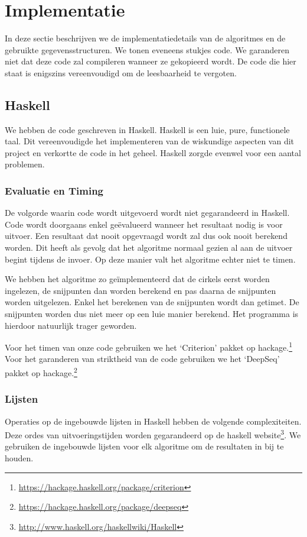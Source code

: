 \newpage
\section{Implementatie}
\label{sec:implementation}
In deze sectie beschrijven we de implementatiedetails van de algoritmes en de gebruikte gegevensstructuren. We tonen eveneens stukjes code. We garanderen niet dat deze code zal compileren wanneer ze gekopieerd wordt. De code die hier staat is enigszins vereenvoudigd om de leesbaarheid te vergoten.

\subsection{Haskell}
We hebben de code geschreven in Haskell. Haskell is een luie, pure,  functionele taal. Dit vereenvoudigde het implementeren van de wiskundige aspecten van dit project en verkortte de code in het geheel.
Haskell zorgde evenwel voor een aantal problemen.

\subsubsection{Evaluatie en Timing}
De volgorde waarin code wordt uitgevoerd wordt niet gegarandeerd in Haskell.
Code wordt doorgaans enkel ge\"evalueerd wanneer het resultaat nodig is voor uitvoer.
Een resultaat dat nooit opgevraagd wordt zal dus ook nooit berekend worden.
Dit heeft als gevolg dat het algoritme normaal gezien al aan de uitvoer begint tijdens de invoer.
Op deze manier valt het algoritme echter niet te timen.

We hebben het algoritme zo ge\"implementeerd dat de cirkels eerst worden ingelezen, de snijpunten dan worden berekend en pas daarna de snijpunten worden uitgelezen. Enkel het berekenen van de snijpunten wordt dan getimet. De snijpunten worden dus niet meer op een luie manier berekend. Het programma is hierdoor natuurlijk trager geworden.

Voor het timen van onze code gebruiken we het `Criterion' pakket op hackage.\footnote{\url{https://hackage.haskell.org/package/criterion}}
Voor het garanderen van striktheid van de code gebruiken we het `DeepSeq' pakket op hackage.\footnote{\url{https://hackage.haskell.org/package/deepseq}}

\subsubsection{Lijsten}
Operaties op de ingebouwde lijsten in Haskell hebben de volgende complexiteiten. Deze ordes van uitvoeringstijden worden gegarandeerd op de haskell website\footnote{\url{http://www.haskell.org/haskellwiki/Haskell}}. We gebruiken de ingebouwde lijsten voor elk algoritme om de resultaten in bij te houden.

